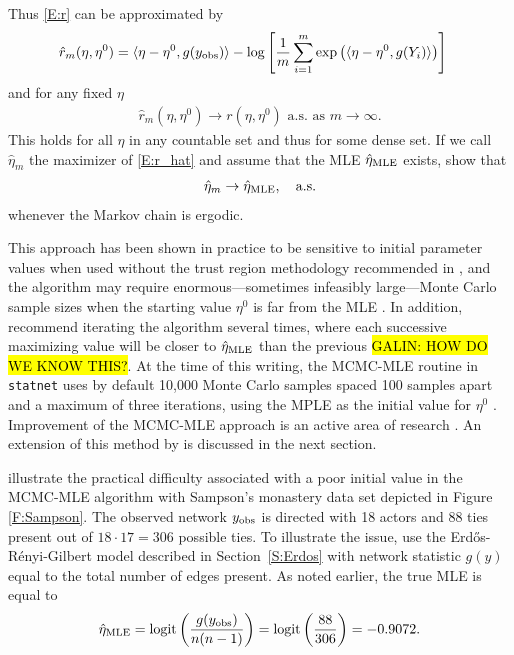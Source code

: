 Thus \eqref{E:r} can be approximated by
\begin{align}
\hat{r}_m( \eta, \eta^0 ) &= \langle  \eta - \eta^0, g(y_{\text{obs}}) \rangle - \log 
	\left [ \frac{1}{m} \sum_{i=1}^{m} \exp \left ( \langle  \eta - \eta^0, g(Y_i) \rangle \right ) \right ] 
	\label{E:r_hat}
\end{align}
and for any fixed $\eta$
\begin{align*}
	\hat{r}_m( \eta, \eta^0 ) \to r( \eta, \eta^0 ) \text{ a.s. as $m \to \infty$}.
\end{align*}
This holds for all $\eta$ in any countable set and thus for some dense set.
If we call $\hat{\eta}_m$  the maximizer of \eqref{E:r_hat} and assume that the MLE 
$\hat{\eta}_{\textrm{MLE}}$ exists, \citeauthor{Geyer:1992} show that 
\begin{align*}
	\hat{\eta}_m \to \hat{\eta}_{\textrm{MLE}}, \quad \text{a.s.}
\end{align*}
 whenever the Markov chain is ergodic. 
 
This approach has been shown in practice to be sensitive to initial parameter 
values when used without the trust region methodology recommended in \citet{Geyer:1992}, 
and the algorithm may require enormous---sometimes infeasibly large---Monte Carlo sample sizes 
when the starting value $\eta^0$ is far from the MLE \citep{ergm}.  
In addition, \citeauthor{Geyer:1992} recommend iterating the algorithm several times, 
where each successive maximizing value will be closer to $\hat{\eta}_{\textrm{MLE}}$ than the previous \hl{GALIN: HOW DO WE KNOW THIS?}.  At the 
time of this writing, the MCMC-MLE routine in \texttt{statnet} uses by default 10,000 
Monte Carlo samples spaced 100 samples apart and a maximum of three iterations, using the 
MPLE as the initial value for $\eta^0$ \citep{statnet:R}.  
Improvement of the MCMC-MLE approach is an active area of research \citep*{Bartz}.
An extension of this method by \citet{Hummel} is discussed in the next section.

\citet{ergm} illustrate the practical difficulty associated with a poor initial 
value in the MCMC-MLE algorithm with Sampson's monastery data set depicted in 
Figure \ref{F:Sampson}.  The 
observed network $y_{\text{obs}}$ is directed with 18 actors and 88 ties present out of $18 \cdot 17=306$ possible 
ties.  To illustrate the issue, \citeauthor{ergm} use the Erd\H{o}s-R\'{e}nyi-Gilbert model 
described in Section~\ref{S:Erdos} with network statistic $g(y)$ equal to the total number of 
edges present.  As noted earlier, the true MLE is equal to 
\begin{align*}
	\hat{\eta}_{\textrm{MLE}} = \operatorname{logit}\left( \frac{g(y_{\text{obs}})}{n(n-1)}\right) = \operatorname{logit} \left( \frac{88}{306}\right ) = -0.9072.
\end{align*}
  
